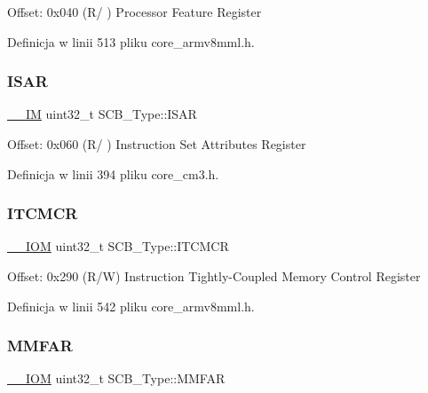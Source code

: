 Offset\+: 0x040 (R/ ) Processor Feature Register 

Definicja w linii 513 pliku core\+\_\+armv8mml.\+h.

\mbox{\label{struct_s_c_b___type_a00e93446b3433a807f1574fa2f1fce54}} 
\subsubsection{\texorpdfstring{I\+S\+AR}{ISAR}}
{\footnotesize\ttfamily \hyperlink{core__sc300_8h_a4cc1649793116d7c2d8afce7a4ffce43}{\+\_\+\+\_\+\+IM} uint32\+\_\+t S\+C\+B\+\_\+\+Type\+::\+I\+S\+AR}

Offset\+: 0x060 (R/ ) Instruction Set Attributes Register 

Definicja w linii 394 pliku core\+\_\+cm3.\+h.

\mbox{\label{struct_s_c_b___type_aba8abbd3db06a07b50f56547501983f9}} 
\subsubsection{\texorpdfstring{I\+T\+C\+M\+CR}{ITCMCR}}
{\footnotesize\ttfamily \hyperlink{core__sc300_8h_ab6caba5853a60a17e8e04499b52bf691}{\+\_\+\+\_\+\+I\+OM} uint32\+\_\+t S\+C\+B\+\_\+\+Type\+::\+I\+T\+C\+M\+CR}

Offset\+: 0x290 (R/W) Instruction Tightly-\/\+Coupled Memory Control Register 

Definicja w linii 542 pliku core\+\_\+armv8mml.\+h.

\mbox{\label{struct_s_c_b___type_a2d03d0b7cec2254f39eb1c46c7445e80}} 
\subsubsection{\texorpdfstring{M\+M\+F\+AR}{MMFAR}}
{\footnotesize\ttfamily \hyperlink{core__sc300_8h_ab6caba5853a60a17e8e04499b52bf691}{\+\_\+\+\_\+\+I\+OM} uint32\+\_\+t S\+C\+B\+\_\+\+Type\+::\+M\+M\+F\+AR}


